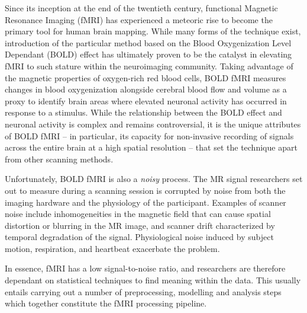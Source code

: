 Since its inception at the end of the twentieth century, functional Magnetic Resonance Imaging (fMRI) has experienced a meteoric rise to become the primary tool for human brain mapping. While many forms of the technique exist, introduction of the particular method based on the Blood Oxygenization Level Dependant (BOLD) effect has ultimately proven to be the catalyst in elevating fMRI to such stature within the neuroimaging community. Taking advantage of the magnetic properties of oxygen-rich red blood cells, BOLD fMRI measures changes in blood oxygenization alongside cerebral blood flow and volume as a proxy to identify brain areas where elevated neuronal activity has occurred in response to a stimulus. While the relationship between the BOLD effect and neuronal activity is complex and remains controversial, it is the unique attributes of BOLD fMRI -- in particular, its capacity for non-invasive recording of signals across the entire brain at a high spatial resolution -- that set the technique apart from other scanning methods.

Unfortunately, BOLD fMRI is also a \textit{noisy} process. The MR signal researchers set out to measure during a scanning session is corrupted by noise from both the imaging hardware and the physiology of the participant. Examples of scanner noise include inhomogeneities in the magnetic field that can cause spatial distortion or blurring in the MR image, and scanner drift characterized by temporal degradation of the signal. Physiological noise induced by subject motion, respiration, and heartbeat exacerbate the problem. 

In essence, fMRI has a low signal-to-noise ratio, and researchers are therefore dependant on statistical techniques to find meaning within the data. This usually entails carrying out a number of preprocessing, modelling and analysis steps which together constitute the fMRI processing pipeline. 